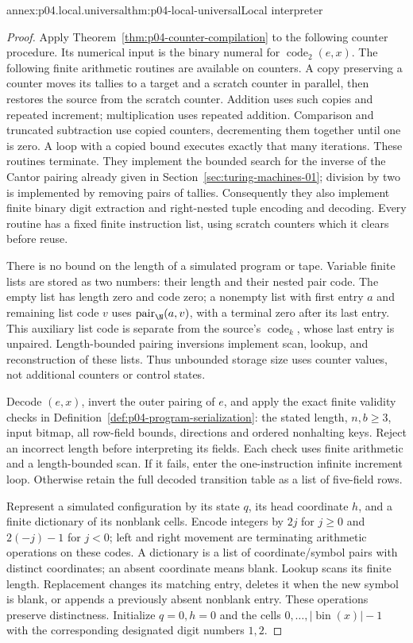\begin{annexitem}{annex:p04.local.universal}{thm:p04-local-universal}{Local interpreter}
\begin{proof}
Apply Theorem~\ref{thm:p04-counter-compilation} to the following counter
procedure.  Its numerical input is the
binary numeral for \(\operatorname{code}_2(e,x)\).  The following finite
arithmetic routines are available on counters.  A copy preserving a
counter moves its tallies to a target and a scratch counter in parallel,
then restores the source from the scratch counter.  Addition uses such
copies and repeated increment; multiplication uses repeated addition.
Comparison and truncated subtraction use copied counters, decrementing
them together until one is zero.  A loop with a copied bound executes
exactly that many iterations.  These routines terminate.  They implement
the bounded search for the inverse of the Cantor pairing already given
in Section~\ref{sec:turing-machines-01}; division by two is implemented
by removing pairs of tallies.  Consequently they also implement finite
binary digit extraction and right-nested tuple encoding and decoding.
Every routine has a fixed finite instruction list, using scratch counters
which it clears before reuse.

There is no bound on the length of a simulated program or tape.  Variable
finite lists are stored as two numbers: their length and their nested
pair code.  The empty list has length zero and code zero; a nonempty list
with first entry \(a\) and remaining list code \(v\) uses
\(\operatorname{pair}_{\N}(a,v)\), with a terminal zero after its last
entry.  This auxiliary list code is separate from the source's
\(\operatorname{code}_k\), whose last entry is unpaired.  Length-bounded
pairing inversions implement scan, lookup, and reconstruction of these
lists.  Thus unbounded storage size uses counter values, not additional
counters or control states.

Decode \((e,x)\), invert the outer pairing of \(e\), and apply the exact
finite validity checks in
Definition~\ref{def:p04-program-serialization}: the stated length,
\(n,b\geq3\), input bitmap, all row-field bounds, directions and ordered
nonhalting keys.  Reject an incorrect length before interpreting its
fields.  Each check uses finite arithmetic and a length-bounded scan.
If it fails, enter the one-instruction infinite increment loop.  Otherwise
retain the full decoded transition table as a list of five-field rows.

Represent a simulated configuration by its state \(q\), its head
coordinate \(h\), and a finite dictionary of its nonblank cells.  Encode
integers by \(2j\) for \(j\geq0\) and \(2(-j)-1\) for \(j<0\);
left and right movement are terminating arithmetic operations on these
codes.  A dictionary is a list of coordinate/symbol pairs with distinct
coordinates; an absent coordinate means blank.  Lookup scans its finite
length.  Replacement changes its matching entry, deletes it when the
new symbol is blank, or appends a previously absent nonblank entry.
These operations preserve distinctness.  Initialize \(q=0,h=0\) and
the cells \(0,\ldots,|\operatorname{bin}(x)|-1\) with the corresponding
designated digit numbers \(1,2\).


\end{proof}
\end{annexitem}
